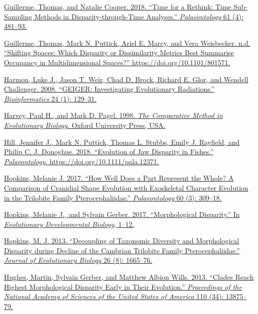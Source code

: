 \href{http://paperpile.com/b/sTGYvp/ekU4}{Guillerme, Thomas, and Natalie
Cooper. 2018. ``Time for a Rethink: Time Sub-Sampling Methods in
Disparity-through-Time Analyses.'' \emph{Palaeontology} 61 (4):
481--93.}

\href{http://paperpile.com/b/sTGYvp/u1KE}{Guillerme, Thomas, Mark N.
Puttick, Ariel E. Marcy, and Vera Weisbecker. n.d. ``Shifting Spaces:
Which Disparity or Dissimilarity Metrics Best Summarise Occupancy in
Multidimensional Spaces?''
https://doi.org/}\href{http://dx.doi.org/10.1101/801571}{10.1101/801571}\href{http://paperpile.com/b/sTGYvp/u1KE}{.}

\href{http://paperpile.com/b/sTGYvp/9Zoi}{Harmon, Luke J., Jason T.
Weir, Chad D. Brock, Richard E. Glor, and Wendell Challenger. 2008.
``GEIGER: Investigating Evolutionary Radiations.'' \emph{Bioinformatics}
24 (1): 129--31.}

\href{http://paperpile.com/b/sTGYvp/WXik}{Harvey, Paul H., and Mark D.
Pagel. 1998. \emph{The Comparative Method in Evolutionary Biology}.
Oxford University Press, USA.}

\href{http://paperpile.com/b/sTGYvp/3JPy}{Hill, Jennifer J., Mark N.
Puttick, Thomas L. Stubbs, Emily J. Rayfield, and Philip C. J. Donoghue.
2018. ``Evolution of Jaw Disparity in Fishes.'' \emph{Palaeontology}.
https://doi.org/}\href{http://dx.doi.org/10.1111/pala.12371}{10.1111/pala.12371}\href{http://paperpile.com/b/sTGYvp/3JPy}{.}

\href{http://paperpile.com/b/sTGYvp/xLdm}{Hopkins, Melanie J. 2017.
``How Well Does a Part Represent the Whole? A Comparison of Cranidial
Shape Evolution with Exoskeletal Character Evolution in the Trilobite
Family Pterocephaliidae.'' \emph{Palaeontology} 60 (3): 309--18.}

\href{http://paperpile.com/b/sTGYvp/vTHS}{Hopkins, Melanie J., and
Sylvain Gerber. 2017. ``Morphological Disparity.'' In \emph{Evolutionary
Developmental Biology}, 1--12.}

\href{http://paperpile.com/b/sTGYvp/hea5}{Hopkins, M. J. 2013.
``Decoupling of Taxonomic Diversity and Morphological Disparity during
Decline of the Cambrian Trilobite Family Pterocephaliidae.''
\emph{Journal of Evolutionary Biology} 26 (8): 1665--76.}

\href{http://paperpile.com/b/sTGYvp/xxh5}{Hughes, Martin, Sylvain
Gerber, and Matthew Albion Wills. 2013. ``Clades Reach Highest
Morphological Disparity Early in Their Evolution.'' \emph{Proceedings of
the National Academy of Sciences of the United States of America} 110
(34): 13875--79.}

